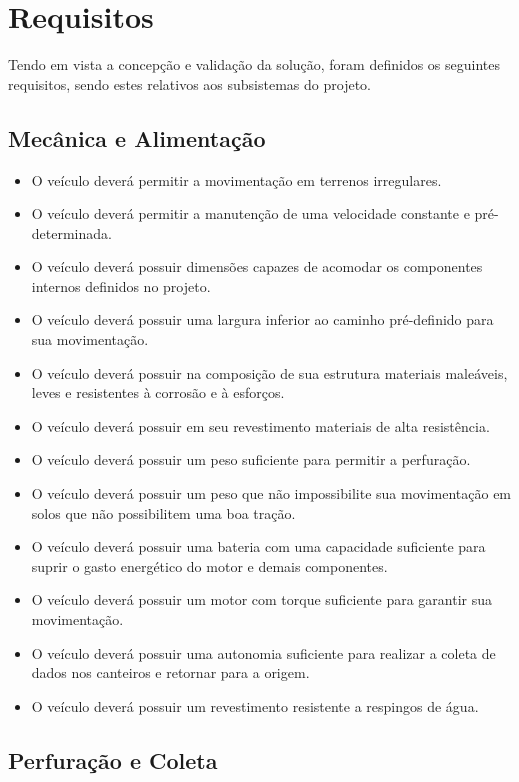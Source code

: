\chapter{Requisitos}

  Tendo em vista a concepção e validação da solução, foram definidos os seguintes
  requisitos, sendo estes relativos aos subsistemas do projeto.

  \section{Mecânica e Alimentação}

    \begin{itemize}
      \item O veículo deverá permitir a movimentação em terrenos irregulares.
      \item O veículo deverá permitir a manutenção de uma velocidade constante e pré-determinada.
      \item O veículo deverá possuir dimensões capazes de acomodar os componentes internos definidos no projeto.
      \item O veículo deverá possuir uma largura inferior ao caminho pré-definido para sua movimentação.
      \item O veículo deverá possuir na composição de sua estrutura materiais maleáveis, leves e resistentes à corrosão e à esforços.
      \item O veículo deverá possuir em seu revestimento materiais de alta resistência.
      \item O veículo deverá possuir um peso suficiente para permitir a perfuração.
      \item O veículo deverá possuir um peso que não impossibilite sua movimentação em solos que não possibilitem uma boa tração.
      \item O veículo deverá possuir uma bateria com uma capacidade suficiente para suprir o gasto energético do motor e demais componentes.
      \item O veículo deverá possuir um motor com torque suficiente para garantir sua movimentação.
      \item O veículo deverá possuir uma autonomia suficiente para realizar a coleta de dados nos canteiros e retornar para a origem.
      \item O veículo deverá possuir um revestimento resistente a respingos de água.
    \end{itemize}

  \section{Perfuração e Coleta}

